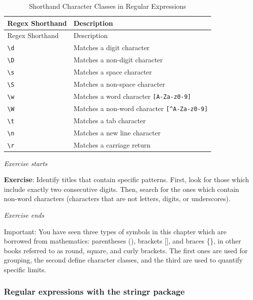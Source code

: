\begin{longtable}[]{@{}ll@{}}
\caption{Shorthand Character Classes in Regular
Expressions}\label{tbl-sequences1}\tabularnewline
\toprule\noalign{}
Regex Shorthand & Description \\
\midrule\noalign{}
\endfirsthead
\toprule\noalign{}
Regex Shorthand & Description \\
\midrule\noalign{}
\endhead
\bottomrule\noalign{}
\endlastfoot
\texttt{\textbackslash{}d} & Matches a digit character \\
\texttt{\textbackslash{}D} & Matches a non-digit character \\
\texttt{\textbackslash{}s} & Matches a space character \\
\texttt{\textbackslash{}S} & Matches a non-space character \\
\texttt{\textbackslash{}w} & Matches a word character
\texttt{{[}A-Za-z0-9{]}} \\
\texttt{\textbackslash{}W} & Matches a non-word character
\texttt{{[}\^{}A-Za-z0-9{]}} \\
\texttt{\textbackslash{}t} & Matches a tab character \\
\texttt{\textbackslash{}n} & Matches a new line character \\
\texttt{\textbackslash{}r} & Matches a carriage return \\
\end{longtable}

\emph{Exercise starts}

\textbf{Exercise}: Identify titles that contain specific patterns.
First, look for those which include exactly two consecutive digits. Then, search
for the ones which contain non-word characters (characters that are not
letters, digits, or underscores).

\emph{Exercise ends}

Important: You have seen three types of symbols in this chapter which
are borrowed from mathematics: parentheses (), brackets {[}{]}, and
braces \{\}, in other books referred to as round, square, and curly
brackets. The first ones are used for grouping, the second define
character classes, and the third are used to quantify specific limits.

\subsubsection{Regular expressions with the stringr
package}\label{regular-expressions-with-the-stringr-package}

